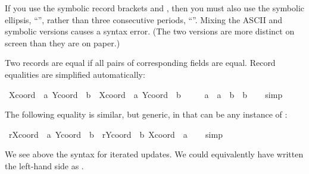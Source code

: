 \begin{isabellebody}
\begin{isamarkuptext}
\begin{warn}
  If you use the symbolic record brackets \isa{{\isasymlparr}} and \isa{{\isasymrparr}},
  then you must also use the symbolic ellipsis, ``\isa{{\isasymdots}}'', rather
  than three consecutive periods, ``\isa{{\isachardot}{\isachardot}{\isachardot}}''.  Mixing the ASCII
  and symbolic versions causes a syntax error.  (The two versions are
  more distinct on screen than they are on paper.)
  \end{warn}%
\end{isamarkuptext}%
\isamarkuptrue%
%
\isamarkuptrue%
%
\begin{isamarkuptext}%
Two records are equal if all pairs of
  corresponding fields are equal.  Record equalities are simplified
  automatically:%
\end{isamarkuptext}%
\isamarkuptrue%
\ {\isachardoublequote}{\isacharparenleft}{\isasymlparr}Xcoord\ {\isacharequal}\ a{\isacharcomma}\ Ycoord\ {\isacharequal}\ b{\isasymrparr}\ {\isacharequal}\ {\isasymlparr}Xcoord\ {\isacharequal}\ a{\isacharprime}{\isacharcomma}\ Ycoord\ {\isacharequal}\ b{\isacharprime}{\isasymrparr}{\isacharparenright}\ {\isacharequal}\isanewline
\ \ \ \ {\isacharparenleft}a\ {\isacharequal}\ a{\isacharprime}\ {\isasymand}\ b\ {\isacharequal}\ b{\isacharprime}{\isacharparenright}{\isachardoublequote}\isanewline
\ \ \isamarkupfalse%
\ simp\isamarkupfalse%
%
\begin{isamarkuptext}%
The following equality is similar, but generic, in that 
  can be any instance of :%
\end{isamarkuptext}%
\isamarkuptrue%
\ {\isachardoublequote}r{\isasymlparr}Xcoord\ {\isacharcolon}{\isacharequal}\ a{\isacharcomma}\ Ycoord\ {\isacharcolon}{\isacharequal}\ b{\isasymrparr}\ {\isacharequal}\ r{\isasymlparr}Ycoord\ {\isacharcolon}{\isacharequal}\ b{\isacharcomma}\ Xcoord\ {\isacharcolon}{\isacharequal}\ a{\isasymrparr}{\isachardoublequote}\isanewline
\ \ \isamarkupfalse%
\ simp\isamarkupfalse%
%
\begin{isamarkuptext}%
We see above the syntax for iterated updates.  We could equivalently
  have written the left-hand side as .


\end{isamarkuptext}
\end{isabellebody}
